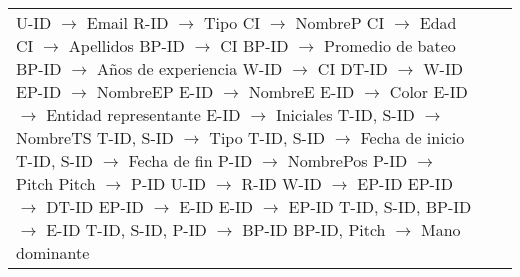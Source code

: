 \documentclass{report}
\begin{document}
\begin{tabularx}{\textwidth}{|X|X|X|}
        U-ID $\rightarrow$ Email \newline 
        R-ID $\rightarrow$ Tipo \newline 
        CI $\rightarrow$ NombreP \newline 
        CI $\rightarrow$ Edad \newline 
        CI $\rightarrow$ Apellidos \newline 
        BP-ID $\rightarrow$ CI \newline 
        BP-ID $\rightarrow$ Promedio de bateo \newline 
        BP-ID $\rightarrow$ Años de experiencia \newline 
        W-ID $\rightarrow$ CI \newline 
        DT-ID $\rightarrow$ W-ID \newline 
        EP-ID $\rightarrow$ NombreEP \newline 
        E-ID $\rightarrow$ NombreE \newline 
        E-ID $\rightarrow$ Color \newline 
        E-ID $\rightarrow$ Entidad representante \newline 
        E-ID $\rightarrow$ Iniciales \newline 
        T-ID, S-ID $\rightarrow$ NombreTS \newline 
        T-ID, S-ID $\rightarrow$ Tipo \newline 
        T-ID, S-ID $\rightarrow$ Fecha de inicio \newline 
        T-ID, S-ID $\rightarrow$ Fecha de fin \newline 
        P-ID $\rightarrow$ NombrePos \newline 
        P-ID $\rightarrow$ Pitch \newline 
        Pitch $\rightarrow$ P-ID \newline 
        U-ID $\rightarrow$ R-ID \newline 
        W-ID $\rightarrow$ EP-ID \newline 
        EP-ID $\rightarrow$ DT-ID \newline 
        EP-ID $\rightarrow$ E-ID \newline 
        E-ID $\rightarrow$ EP-ID \newline 
        T-ID, S-ID, BP-ID $\rightarrow$ E-ID \newline 
        T-ID, S-ID, P-ID $\rightarrow$ BP-ID \newline 
        BP-ID, Pitch $\rightarrow$ Mano dominante \newline 

\end{tabularx}
\end{document}
